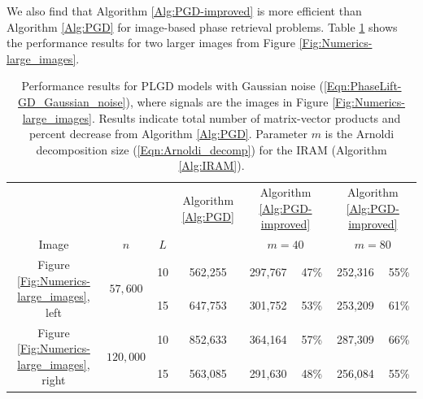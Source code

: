 We also find that Algorithm \ref{Alg:PGD-improved} is more efficient than Algorithm \ref{Alg:PGD} for image-based phase retrieval problems.
Table \ref{Tab:Numerics-ada_vs_orig_large_images} shows the performance results for two larger images from Figure \ref{Fig:Numerics-large_images}.



\begin{table}[H]
\centering
\begin{tabular}{ |ccc|c|cc|cc| }
 \hline
			&&&  Algorithm \ref{Alg:PGD}
			&  \multicolumn{2}{c|}{Algorithm \ref{Alg:PGD-improved}}
			&	\multicolumn{2}{c|}{Algorithm \ref{Alg:PGD-improved}}	\\
Image & $n$ & $L$ &  	& \multicolumn{2}{c|}{$m=40$}  & \multicolumn{2}{c|}{$m=80$}   \\
 \hline
	\multirow{2}{*}{Figure \ref{Fig:Numerics-large_images}, left} &
   \multirow{2}{*}{$57,600$} &  10 &  562,255  &  297,767 & 47\% &  252,316 & 55\% \\ 
  &&  15 &  647,753  &  301,752 & 53\% &  253,209 & 61\% \\ 
	\multirow{2}{*}{Figure \ref{Fig:Numerics-large_images}, right}  &   
     \multirow{2}{*}{$120,000$} &  10 &  852,633  &  364,164 & 57\% &  287,309 & 66\% \\ 
  &&  15 &  563,085  &  291,630 & 48\% &  256,084 & 55\% \\ 
 \hline
\end{tabular}
\caption{
Performance results for PLGD models with Gaussian noise (\ref{Eqn:PhaseLift-GD_Gaussian_noise}), where signals are the images in Figure \ref{Fig:Numerics-large_images}.
Results indicate total number of matrix-vector products and percent decrease from Algorithm \ref{Alg:PGD}.
Parameter $m$ is the Arnoldi decomposition size (\ref{Eqn:Arnoldi_decomp}) for the IRAM (Algorithm \ref{Alg:IRAM}).
	} 
	\label{Tab:Numerics-ada_vs_orig_large_images}
\end{table}



